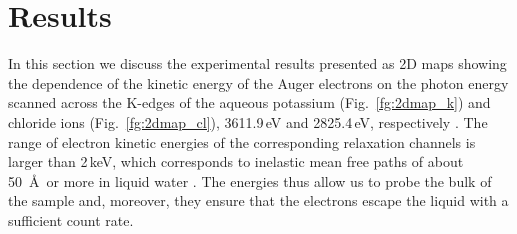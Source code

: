 \section{Results}\label{sec:results}

%


In this section we discuss the experimental results presented as 2D maps showing the dependence of the kinetic energy of the Auger electrons on the photon energy scanned across the K-edges of the aqueous potassium (Fig.\ \ref{fg:2dmap_k}) and chloride ions (Fig.\ \ref{fg:2dmap_cl}), 3611.9\,eV and 2825.4\,eV, respectively \citep{ceolin17}. The range of electron kinetic energies of the corresponding relaxation channels is larger than 2\,keV, which corresponds to inelastic mean free paths of about 50~\AA~or more in liquid water \citep{emfiet09:45}. The energies thus allow us to probe the bulk of the sample and, moreover, they ensure that the electrons escape the liquid with a sufficient count rate.


